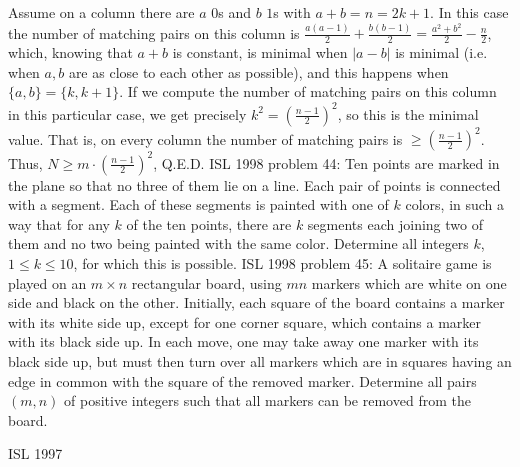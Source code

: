 Assume on a column there are $a$ $0$s and $b$ $1$s with $a+b=n=2k+1$. In this case the number of matching pairs on this column is $\frac{a(a-1)}2+\frac{b(b-1)}2=\frac{a^2+b^2}2-\frac n2$, which, knowing that $a+b$ is constant, is minimal when $|a-b|$ is minimal (i.e. when $a,b$ are as close to each other as possible), and this happens when $\{a,b\}=\{k,k+1\}$. If we compute the number of matching pairs on this column in this particular case, we get precisely $k^2=\left(\frac{n-1}2\right)^2$, so this is the minimal value. That is, on every column the number of matching pairs is $\geq \left(\frac{n-1}2\right)^2$. Thus, $N\geq m\cdot \left(\frac{n-1}2\right)^2$, Q.E.D. 
ISL 1998 problem 44:  Ten points are marked in the plane so that no three of them lie on a line. Each pair of points is connected with a segment. Each of these segments is painted with one of $k$ colors, in such a way that for any $k$ of the ten points, there are $k$ segments each joining two of them and no two being painted with the same color. Determine all integers $k$, $1\leq k\leq 10$, for which this is possible. 
ISL 1998 problem 45:  A solitaire game is played on an $m\times n$ rectangular board, using $mn$ markers which are white on one side and black on the other. Initially, each  square of the board contains a marker with its white side up, except for one corner square, which contains a marker with its black side up. In each move, one may take away one marker with its black side up, but must then turn over  all markers which are in squares having an edge in common with the square of the removed marker. Determine all pairs $(m,n)$ of positive integers such that all markers can be removed from the board. 

ISL 1997 

